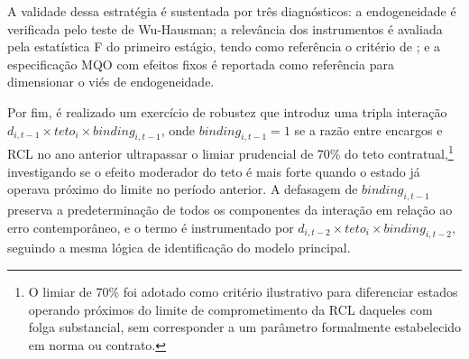A validade dessa estratégia é sustentada por três diagnósticos: a endogeneidade é verificada pelo teste de Wu-Hausman; a relevância dos instrumentos é avaliada pela estatística F do primeiro estágio, tendo como referência o critério de ; e a especificação MQO com efeitos fixos é reportada como referência para dimensionar o viés de endogeneidade.

Por fim, é realizado um exercício de robustez que introduz uma tripla interação $d_{i,t-1} \times teto_i \times binding_{i,t-1}$, onde $binding_{i,t-1} = 1$ se a razão entre encargos e RCL no ano anterior ultrapassar o limiar prudencial de 70\% do teto contratual,\footnote{O limiar de 70\% foi adotado como critério ilustrativo para diferenciar estados operando próximos do limite de comprometimento da RCL daqueles com folga substancial, sem corresponder a um parâmetro formalmente estabelecido em norma ou contrato.} investigando se o efeito moderador do teto é mais forte quando o estado já operava próximo do limite no período anterior. A defasagem de $binding_{i,t-1}$ preserva a predeterminação de todos os componentes da interação em relação ao erro contemporâneo, e o termo é instrumentado por $d_{i,t-2} \times teto_i \times binding_{i,t-2}$, seguindo a mesma lógica de identificação do modelo principal.